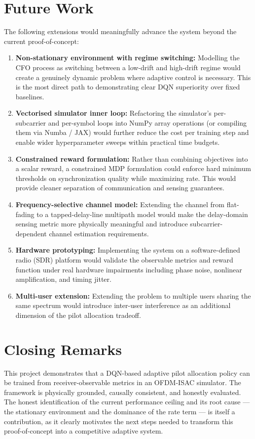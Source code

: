 \section{Future Work}

The following extensions would meaningfully advance the system beyond the current proof-of-concept:

\begin{enumerate}
    \item \textbf{Non-stationary environment with regime switching:} Modelling the CFO process as switching between a low-drift and high-drift regime would create a genuinely dynamic problem where adaptive control is necessary. This is the most direct path to demonstrating clear DQN superiority over fixed baselines.

    \item \textbf{Vectorised simulator inner loop:} Refactoring the simulator's per-subcarrier and per-symbol loops into NumPy array operations (or compiling them via Numba / JAX) would further reduce the cost per training step and enable wider hyperparameter sweeps within practical time budgets.

    \item \textbf{Constrained reward formulation:} Rather than combining objectives into a scalar reward, a constrained MDP formulation could enforce hard minimum thresholds on synchronization quality while maximizing rate. This would provide cleaner separation of communication and sensing guarantees.

    \item \textbf{Frequency-selective channel model:} Extending the channel from flat-fading to a tapped-delay-line multipath model would make the delay-domain sensing metric more physically meaningful and introduce subcarrier-dependent channel estimation requirements.

    \item \textbf{Hardware prototyping:} Implementing the system on a software-defined radio (SDR) platform would validate the observable metrics and reward function under real hardware impairments including phase noise, nonlinear amplification, and timing jitter.

    \item \textbf{Multi-user extension:} Extending the problem to multiple users sharing the same spectrum would introduce inter-user interference as an additional dimension of the pilot allocation tradeoff.
\end{enumerate}

\section{Closing Remarks}

This project demonstrates that a DQN-based adaptive pilot allocation policy can be trained from receiver-observable metrics in an OFDM-ISAC simulator. The framework is physically grounded, causally consistent, and honestly evaluated. The honest identification of the current performance ceiling and its root cause — the stationary environment and the dominance of the rate term — is itself a contribution, as it clearly motivates the next steps needed to transform this proof-of-concept into a competitive adaptive system.

